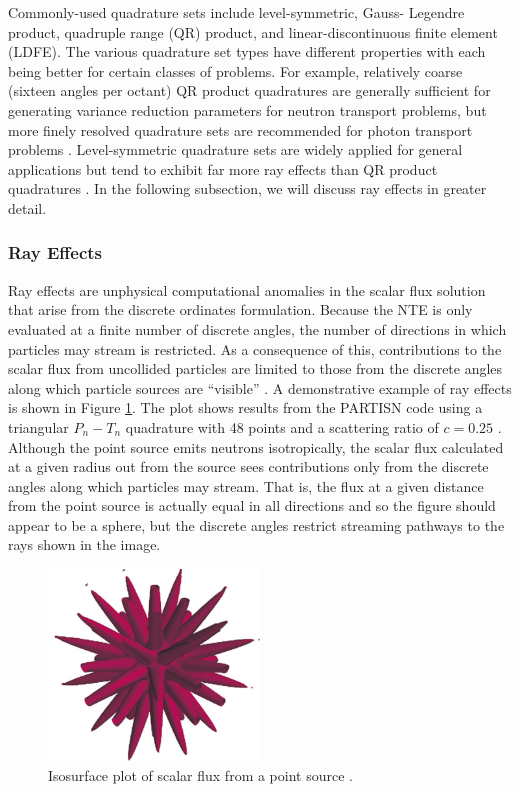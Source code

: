 \FloatBarrier Commonly-used quadrature sets include level-symmetric, Gauss-
Legendre product, quadruple range (QR) product, and linear-discontinuous
finite element (LDFE). The various quadrature set types have different
properties with each being better for certain classes of problems. For
example, relatively coarse (sixteen angles per octant) QR product quadratures
are generally sufficient for generating variance reduction parameters for
neutron transport problems, but more finely resolved quadrature sets are
recommended for photon transport problems \cite{advantg}. Level-symmetric
quadrature sets are widely applied for general applications \cite{lm} but
tend to exhibit far more ray effects than QR product quadratures
\cite{advantg}. In the following subsection, we will discuss ray effects in
greater detail.

\subsubsection{Ray Effects}
\label{sec:ray}

Ray effects are unphysical computational anomalies in the scalar flux solution that 
arise from the discrete ordinates formulation. Because the NTE is only evaluated  
 at a finite number of discrete angles, the number of directions in 
which particles may stream is restricted. As a consequence of this, contributions to 
the scalar flux from uncollided particles are limited to those from the discrete 
angles along which particle sources are ``visible'' \cite{lathrop}. A demonstrative
example of ray effects is shown in Figure \ref{fig:ray}. The plot shows results from 
the PARTISN \cite{partisn} code using a triangular $P_n - T_n$ quadrature with
48 points and a
scattering ratio of $c = 0.25$ \cite{ahrens}. Although the point source
emits neutrons isotropically, the scalar flux calculated at a given radius out from 
the source sees contributions only from the discrete angles along which particles may
stream. That is, the flux at a given distance from the point source is actually equal 
in all directions and so the figure should appear to be a sphere, but the discrete
angles restrict streaming pathways to the rays shown in the image. 

\begin{figure}[!htb]
\centering
\includegraphics[width=0.5\textwidth]{img/ray-effects.png}
\caption{Isosurface plot of scalar flux from a point source \cite{ahrens}.}
\label{fig:ray}
\end{figure}

